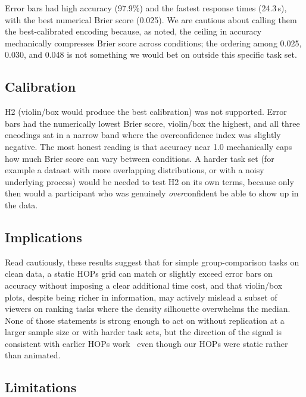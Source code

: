 \documentclass{article}
\begin{document}
Error bars had high accuracy (97.9\%) and the fastest response times
(24.3\,s), with the best numerical Brier score (0.025).  We are
cautious about calling them the best-calibrated encoding because, as
noted, the ceiling in accuracy mechanically compresses Brier score
across conditions; the ordering among 0.025, 0.030, and 0.048 is not
something we would bet on outside this specific task set.

\subsection{Calibration}

H2 (violin/box would produce the best calibration) was not supported.
Error bars had the numerically lowest Brier score, violin/box the
highest, and all three encodings sat in a narrow band where the
overconfidence index was slightly negative.  The most honest reading
is that accuracy near 1.0 mechanically caps how much Brier score can
vary between conditions.  A harder task set (for example a dataset
with more overlapping distributions, or with a noisy underlying
process) would be needed to test H2 on its own terms, because only
then would a participant who was genuinely \emph{over}confident be
able to show up in the data.

\subsection{Implications}

Read cautiously, these results suggest that for simple group-comparison
tasks on clean data, a static HOPs grid can match or slightly exceed
error bars on accuracy without imposing a clear additional time cost,
and that violin/box plots, despite being richer in information, may
actively mislead a subset of viewers on ranking tasks where the
density silhouette overwhelms the median.  None of those statements
is strong enough to act on without replication at a larger sample
size or with harder task sets, but the direction of the signal is
consistent with earlier HOPs work~\cite{hullman2015} even though our
HOPs were static rather than animated.

\subsection{Limitations}
\end{document}

